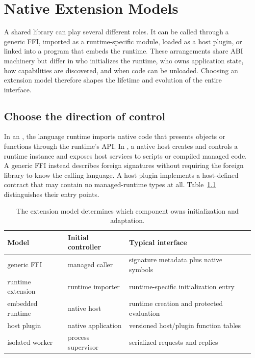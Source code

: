 \chapter{Native Extension Models}
\label{ch:extension-models}

A shared library can play several different roles.
It can be called through a generic FFI, imported as a runtime-specific module, loaded as a host plugin, or linked into a program that embeds the runtime.
These arrangements share ABI machinery but differ in who initializes the runtime, who owns application state, how capabilities are discovered, and when code can be unloaded.
Choosing an extension model therefore shapes the lifetime and evolution of the entire interface.

\section{Choose the direction of control}
\label{sec:ch75-models}
In an , the language runtime imports native code that presents objects or functions through the runtime's API.
In , a native host creates and controls a runtime instance and exposes host services to scripts or compiled managed code.
A generic FFI instead describes foreign signatures without requiring the foreign library to know the calling language.
A host plugin implements a host-defined contract that may contain no managed-runtime types at all.
Table~\ref{tab:ch75-models} distinguishes their entry points.

\begin{table}[htbp]
\caption{The extension model determines which component owns initialization and adaptation.}
\label{tab:ch75-models}
\centering
\begin{tabular}{lll}
\toprule
Model & Initial controller & Typical interface \\
\midrule
generic FFI & managed caller & signature metadata plus native symbols \\
runtime extension & runtime importer & runtime-specific initialization entry \\
embedded runtime & native host & runtime creation and protected evaluation \\
host plugin & native application & versioned host/plugin function tables \\
isolated worker & process supervisor & serialized requests and replies \\
\bottomrule
\end{tabular}
\end{table}

